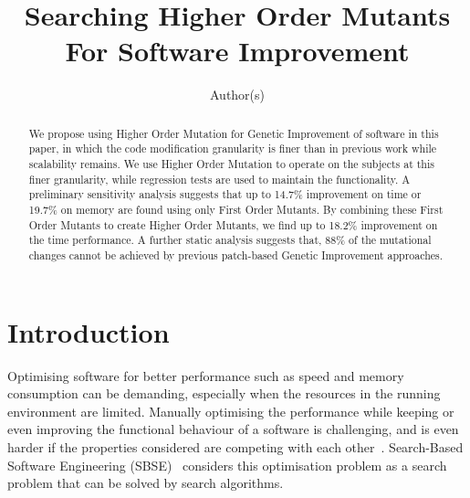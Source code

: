 \documentclass[oribibl]{llncs}
\begin{document}
\title{Searching Higher Order Mutants For Software Improvement}

\author{Author(s)
}



\maketitle

\begin{abstract}
We propose using Higher Order Mutation for Genetic Improvement of software in this paper, in which the code modification granularity is finer than in previous work while scalability remains.
We use Higher Order Mutation to operate on the subjects at this finer granularity, while regression tests are used to maintain the functionality.
A preliminary sensitivity analysis suggests that up to 14.7\% improvement on time or 19.7\% on memory are found using only First Order Mutants.
By combining these First Order Mutants to create Higher Order Mutants, we find up to 18.2\% improvement on the time performance.
A further static analysis suggests that, 88\% of the mutational changes cannot be achieved by previous patch-based Genetic Improvement approaches.
\end{abstract}

\section{Introduction}
\label{sec_intro}

Optimising software for better performance such as speed and memory consumption can be demanding, especially when the resources in the running environment are limited.
Manually optimising the performance while keeping or even improving the functional behaviour of a software is challenging, 
and is even harder if the properties considered are competing with each other~\cite{Harman:2012:GCC:2351676.2351678}.
Search-Based Software Engineering (SBSE)~\cite{Harman2001833} considers this optimisation problem as a search problem that can be solved by search algorithms.
\end{document}
